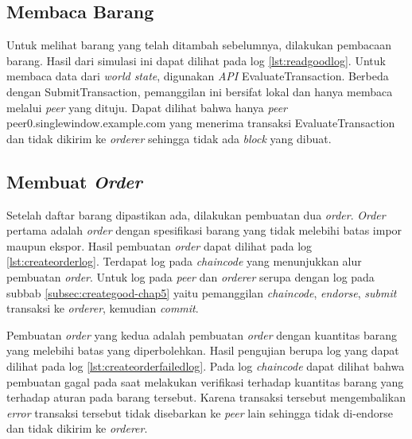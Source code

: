 \subsection{Membaca Barang}
\label{subsec:readgoodlog}
Untuk melihat barang yang telah ditambah sebelumnya, dilakukan pembacaan barang. Hasil dari simulasi ini dapat dilihat pada log \ref{lst:readgoodlog}. Untuk membaca data dari \textit{world state}, digunakan \textit{API} EvaluateTransaction. Berbeda dengan SubmitTransaction, pemanggilan ini bersifat lokal dan hanya membaca melalui \textit{peer} yang dituju. Dapat dilihat bahwa hanya \textit{peer} peer0.singlewindow.example.com yang menerima transaksi EvaluateTransaction dan tidak dikirim ke \textit{orderer} sehingga tidak ada \textit{block} yang dibuat.



\subsection{Membuat \textit{Order}}
Setelah daftar barang dipastikan ada, dilakukan pembuatan dua \textit{order}. \textit{Order} pertama adalah \textit{order} dengan spesifikasi barang yang tidak melebihi batas impor maupun ekspor. Hasil pembuatan \textit{order} dapat dilihat pada log \ref{lst:createorderlog}. Terdapat log pada \textit{chaincode} yang menunjukkan alur pembuatan \textit{order}. Untuk log pada \textit{peer} dan \textit{orderer} serupa dengan log pada subbab \ref{subsec:creategood-chap5} yaitu pemanggilan \textit{chaincode}, \textit{endorse}, \textit{submit} transaksi ke \textit{orderer}, kemudian \textit{commit}. 



Pembuatan \textit{order} yang kedua adalah pembuatan \textit{order} dengan kuantitas barang yang melebihi batas yang diperbolehkan. Hasil pengujian berupa log yang dapat dilihat pada log \ref{lst:createorderfailedlog}. Pada log \textit{chaincode} dapat dilihat bahwa pembuatan gagal pada saat melakukan verifikasi terhadap kuantitas barang yang terhadap aturan pada barang tersebut. Karena transaksi tersebut mengembalikan \textit{error} transaksi tersebut tidak disebarkan ke \textit{peer} lain sehingga tidak di-endorse dan tidak dikirim ke \textit{orderer}.



